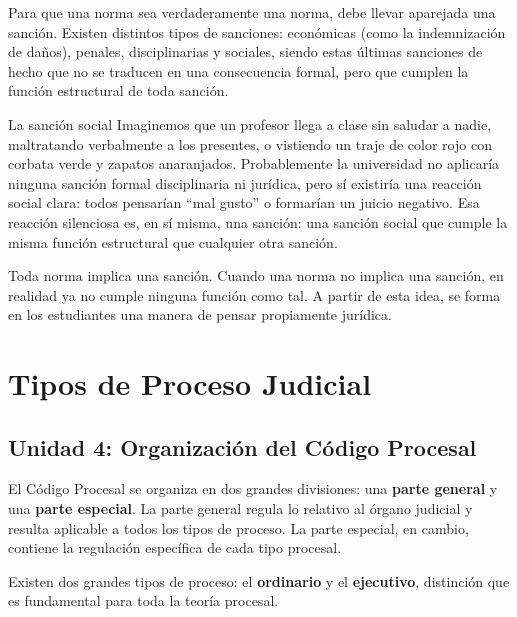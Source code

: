 \documentclass[12pt,oneside]{book}
\begin{document}
Para que una norma sea verdaderamente una norma, debe llevar aparejada una sanción. Existen distintos tipos de sanciones: económicas (como la indemnización de daños), penales, disciplinarias y sociales, siendo estas últimas sanciones de hecho que no se traducen en una consecuencia formal, pero que cumplen la función estructural de toda sanción.

\begin{example}{La sanción social}
Imaginemos que un profesor llega a clase sin saludar a nadie, maltratando verbalmente a los presentes, o vistiendo un traje de color rojo con corbata verde y zapatos anaranjados. Probablemente la universidad no aplicaría ninguna sanción formal disciplinaria ni jurídica, pero sí existiría una reacción social clara: todos pensarían ``mal gusto'' o formarían un juicio negativo. Esa reacción silenciosa es, en sí misma, una sanción: una sanción social que cumple la misma función estructural que cualquier otra sanción.
\end{example}

\begin{important}
Toda norma implica una sanción. Cuando una norma no implica una sanción, en realidad ya no cumple ninguna función como tal. A partir de esta idea, se forma en los estudiantes una manera de pensar propiamente jurídica.
\end{important}


\chapter{Tipos de Proceso Judicial}

\section{Unidad 4: Organización del Código Procesal}

El Código Procesal se organiza en dos grandes divisiones: una \textbf{parte general} y una \textbf{parte especial}. La parte general regula lo relativo al órgano judicial y resulta aplicable a todos los tipos de proceso. La parte especial, en cambio, contiene la regulación específica de cada tipo procesal.

Existen dos grandes tipos de proceso: el \textbf{ordinario} y el \textbf{ejecutivo}, distinción que es fundamental para toda la teoría procesal.
\end{document}
